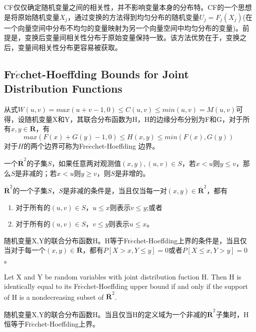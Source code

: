 CF仅仅确定随机变量之间的相关性，并不影响变量本身的分布特。CF的一个思想是将原始随机变量$X_j$，通过变换的方法得到均匀分布的随机变量$U_j = F_j(X_j)$(在一个向量空间中分布不均匀的变量映射为另一个向量空间中均匀分布的变量)。前提是，变换后变量间相关性分布于原始变量保持一致。该方法优势在于，变换之后，变量间相关性分布更容易被获取。



\subsection{Fr$\acute{e}$chet-Hoeffding Bounds for Joint Distribution Functions}
从式$W(u,v)=max(u+v-1,0)\leq C(u,v) \leq min(u,v)=M(u,v)$可得，设随机变量X和Y，其联合分布函数为H，H的边缘分布分别为F和G，对于所有$x,y \in \overline{\mathbf{R}}$，有
\begin{equation}
    max(F(x)+G(y)-1,0) \leq H(x,y) \leq min(F(x),G(y))
    \label{eq2.5.1}
\end{equation}
对于$H$的两个边界可称为Fre$\acute{e}$chet-Hoeffding 边界。
\begin{definition}
    一个$\overline{\mathbf{R}}^2$的子集$S$，如果任意两对观测值$(x,y),(u,v) \in S$，若$x<u$则$y\leq v$，那么$S$是非减的；若$x<u$则$y\geq v$，则$S$是非增的。
    \label{def-fh}
\end{definition}
\begin{lemma}
    $\overline{\mathbf{R}}^2$的一个子集$S$，$S$是非减的条件是，当且仅当每一对$(x,y) \in \overline{\mathbf{R}}^2$，都有
    \begin{enumerate}
        \item 对于所有的$(u,v) \in S$，$u\leq x$则表示$v\leq y$;或者
        \item 对于所有的$(u,v) \in S$，$v\leq y$则表示$u\leq x$。
    \end{enumerate}
    \label{lemma-fh1}
\end{lemma}
\begin{lemma}
    随机变量X,Y的联合分布函数H。H等于Fr$\acute{e}$chet-Hoeffding上界的条件是，当且仅当对于每一个$(x,y)\in\overline{\mathbf{R}}$，都有$P[X>x,Y\leq y] = 0$或者$P[X\leq x,Y>y]=0$。
    \label{lemma-fh2}
\end{lemma}
\begin{theorem}
    Let X and Y be random variables with joint distribution fuction H. Then H is identically equal to its Fr$\acute{e}$chet-Hoeffding upper bound if and only if the support of H is a nondecreasing subset of $\overline{\mathbf{R}}^2$.
    
    随机变量X,Y的联合分布函数H。当且仅当H的定义域为一个非减的$\overline{\mathbf{R}}^2$子集时，H恒等于Fr$\acute{e}$chet-Hoeffding上界。
    \label{thr-fhupper}
\end{theorem}


